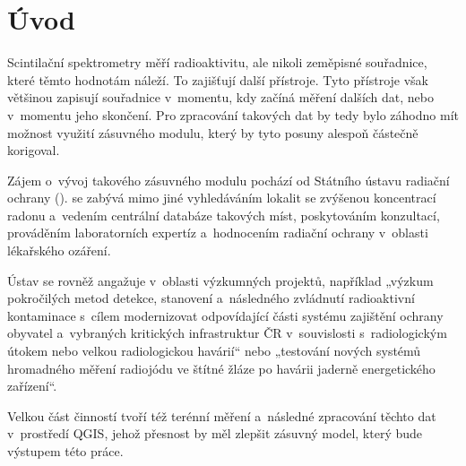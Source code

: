 \chapter{Úvod}
\label{1-uvod}

Scintilační spektrometry měří radioaktivitu, ale nikoli zeměpisné souřadnice, které těmto hodnotám
náleží. To zajišťují další přístroje. Tyto přístroje však většinou zapisují souřadnice
v~momentu, kdy začíná měření dalších dat, nebo v~momentu jeho skončení. Pro zpracování takových dat
by tedy bylo záhodno mít možnost využití zásuvného modulu, který by tyto posuny alespoň částečně korigoval. 

Zájem o~vývoj takového zásuvného modulu pochází od Státního ústavu radiační ochrany ().
 se zabývá mimo jiné vyhledáváním lokalit se zvýšenou koncentrací radonu a~vedením centrální
databáze takových míst, poskytováním konzultací, prováděním laboratorních expertíz a~hodnocením
radiační ochrany v~oblasti lékařského ozáření. 

Ústav se rovněž angažuje v~oblasti výzkumných projektů, například „výzkum pokročilých metod detekce,
stanovení a~následného zvládnutí radioaktivní kontaminace s~cílem modernizovat odpovídající části
systému zajištění ochrany obyvatel a~vybraných kritických infrastruktur ČR v~souvislosti
s~radiologickým útokem nebo velkou radiologickou havárií“ nebo „testování nových systémů
hromadného měření radiojódu ve štítné žláze po havárii jaderně energetického zařízení“. \cite{surovyzkum}

Velkou část činností  tvoří též terénní měření a~následné zpracování
těchto dat v~prostředí QGIS, jehož přesnost by měl zlepšit zásuvný model, který bude výstupem této práce. 


